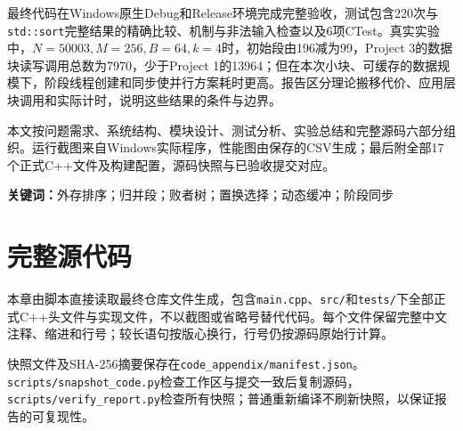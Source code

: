 \documentclass[UTF8,a4paper,zihao=-4,oneside,fontset=fandol]{ctexrep}
\newcommand{\code}[1]{\nolinkurl{#1}}
\begin{document}
最终代码在Windows原生Debug和Release环境完成完整验收，测试包含220次与\code{std::sort}完整结果的精确比较、机制与非法输入检查以及6项CTest。真实实验中，$N=50003,M=256,B=64,k=4$时，初始段由196减为99，Project 3的数据块读写调用总数为7970，少于Project 1的13964；但在本次小块、可缓存的数据规模下，阶段线程创建和同步使并行方案耗时更高。报告区分理论搬移代价、应用层块调用和实际计时，说明这些结果的条件与边界。

本文按问题需求、系统结构、模块设计、测试分析、实验总结和完整源码六部分组织。运行截图来自Windows实际程序，性能图由保存的CSV生成；最后附全部17个正式C++文件及构建配置，源码快照与已验收提交对应。

\noindent\textbf{关键词：}外存排序；归并段；败者树；置换选择；动态缓冲；阶段同步
\tableofcontents\clearpage
{}





\chapter{完整源代码}\label{chap:source}
本章由脚本直接读取最终仓库文件生成，包含\code{main.cpp}、\code{src/}和\code{tests/}下全部正式C++头文件与实现文件，不以截图或省略号替代代码。每个文件保留完整中文注释、缩进和行号；较长语句按版心换行，行号仍按源码原始行计算。



快照文件及SHA-256摘要保存在\code{code_appendix/manifest.json}。\code{scripts/snapshot_code.py}检查工作区与提交一致后复制源码，\code{scripts/verify_report.py}检查所有快照；普通重新编译不刷新快照，以保证报告的可复现性。

\end{document}
